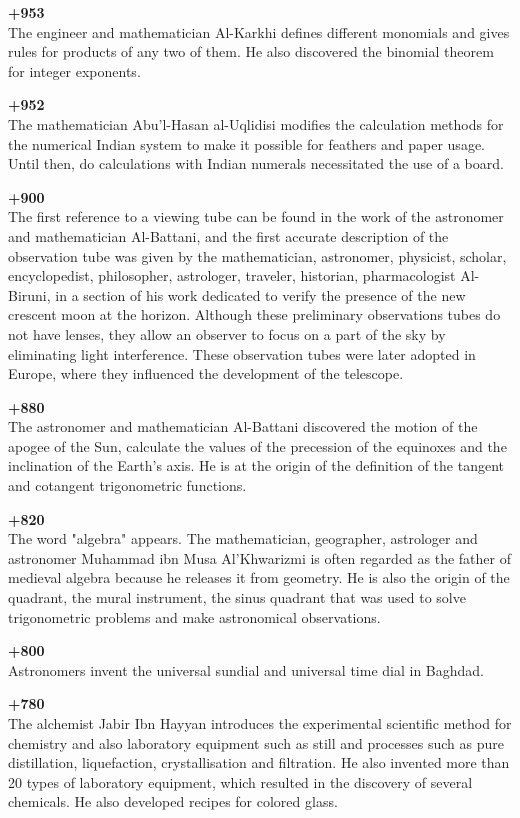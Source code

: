 \textbf{+953}\\
The engineer and mathematician Al-Karkhi defines different monomials and gives rules for products of any two of them. He also discovered the binomial theorem for integer exponents.

\textbf{+952}\\
The mathematician Abu'l-Hasan al-Uqlidisi modifies the calculation methods for the numerical Indian system to make it possible for feathers and paper usage. Until then, do calculations with Indian numerals necessitated the use of a board.

\textbf{+900}\\
The first reference to a viewing tube can be found in the work of the astronomer and mathematician Al-Battani, and the first accurate description of the observation tube was given by the mathematician, astronomer, physicist, scholar, encyclopedist, philosopher, astrologer, traveler, historian, pharmacologist Al-Biruni, in a section of his work dedicated to verify the presence of the new crescent moon at the horizon. Although these preliminary observations tubes do not have lenses, they allow an observer to focus on a part of the sky by eliminating light interference. These observation tubes were later adopted in Europe, where they influenced the development of the telescope.

\textbf{+880}\\
The astronomer and mathematician Al-Battani discovered the motion of the apogee of the Sun, calculate the values of the precession of the equinoxes and the inclination of the Earth's axis. He is at the origin of the definition of the tangent and cotangent trigonometric functions.

\textbf{+820}\\
The word "algebra" appears. The mathematician, geographer, astrologer and astronomer Muhammad ibn Musa Al'Khwarizmi is often regarded as the father of medieval algebra because he releases it from geometry. He is also the origin of the quadrant, the mural instrument, the sinus quadrant that was used to solve trigonometric problems and make astronomical observations.

\textbf{+800}\\
Astronomers invent the universal sundial and universal time dial in Baghdad.

\textbf{+780}\\
The alchemist Jabir Ibn Hayyan introduces the experimental scientific method for chemistry and also laboratory equipment such as still and processes such as pure distillation, liquefaction, crystallisation and filtration. He also invented more than 20 types of laboratory equipment, which resulted in the discovery of several chemicals. He also developed recipes for colored glass.

